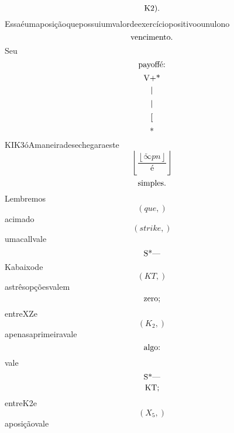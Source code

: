 \documentclass{article}
\begin{document}
\begin{equation}
$K2).$
\end{equation}Essaéumaposiçãoquepossuiumvalordeexercíciopositivoounulono\begin{equation}
$vencimento.$
\end{equation}Seu\begin{equation}
$payoffé:$
\end{equation}\begin{equation}
$V+*$
\end{equation}\begin{equation}
$|$
\end{equation}\begin{equation}
$|$
\end{equation}\begin{equation}
$[$
\end{equation}\begin{equation}
$*$
\end{equation}KIK3óAmaneiradesechegaraeste\begin{equation}
\left\lfloor{\frac{\left\lfloor{\tilde{\infty} pn}\right\rfloor}{é}}\right\rfloor
\end{equation}\begin{equation}
$simples.$
\end{equation}Lembremos\begin{equation}
\left( que,\right)
\end{equation}acimado\begin{equation}
\left( strike,\right)
\end{equation}umacallvale\begin{equation}
$S*—$
\end{equation}Kabaixode\begin{equation}
\left( KT,\right)
\end{equation}astrêsopçõesvalem\begin{equation}
$zero;$
\end{equation}entreXZe\begin{equation}
\left( K_{2},\right)
\end{equation}apenasaprimeiravale\begin{equation}
$algo:$
\end{equation}vale\begin{equation}
$S*—$
\end{equation}\begin{equation}
$KT;$
\end{equation}entreK2e\begin{equation}
\left( X_{5},\right)
\end{equation}aposiçãovale\begin{equation}

\end{equation}
\end{document}

